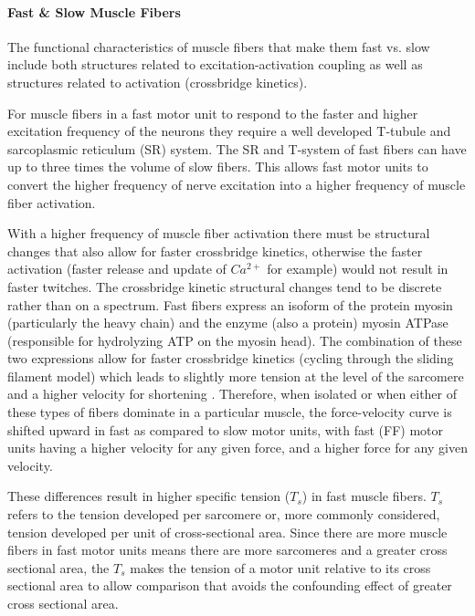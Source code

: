 \paragraph{Fast \& Slow Muscle Fibers}

The functional characteristics of muscle fibers that make them fast vs. slow include both structures related to excitation-activation coupling as well as structures related to activation (crossbridge kinetics). 

For muscle fibers in a fast motor unit to respond to the faster and higher excitation frequency of the neurons they require a well developed T-tubule and sarcoplasmic reticulum (SR) system. The SR and T-system of fast fibers can have up to three times the volume of slow fibers. This allows fast motor units to convert the higher frequency of nerve excitation into a higher frequency of muscle fiber activation.

With a higher frequency of muscle fiber activation there must be structural changes that also allow for faster crossbridge kinetics, otherwise the faster activation (faster release and update of $Ca^{2+}$ for example) would not result in faster twitches. The crossbridge kinetic structural changes tend to be discrete rather than on a spectrum.\footnotemark{} Fast fibers express an isoform of the protein myosin (particularly the heavy chain) and the enzyme (also a protein) myosin ATPase (responsible for hydrolyzing ATP on the myosin head). The combination of these two expressions allow for faster crossbridge kinetics (cycling through the sliding filament model) which leads to slightly more tension at the level of the sarcomere and a higher velocity for shortening \cite{larsson_maximum_1993, schiaffino_molecular_1996}. Therefore, when isolated or when either of these types of fibers dominate in a particular muscle, the force-velocity curve is shifted upward in fast as compared to slow motor units, with fast (FF) motor units having a higher velocity for any given force, and a higher force for any given velocity. 

These differences result in higher specific tension ($T_s$) in fast muscle fibers. $T_s$ refers to the tension developed per sarcomere or, more commonly considered, tension developed per unit of cross-sectional area. Since there are more muscle fibers in fast motor units means there are more sarcomeres and a greater cross sectional area, the $T_s$ makes the tension of a motor unit relative to its cross sectional area to allow comparison that avoids the confounding effect of greater cross sectional area.

